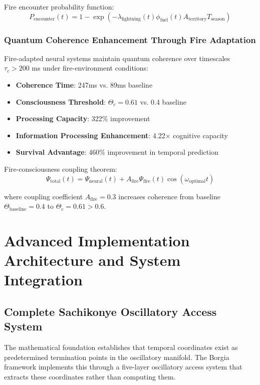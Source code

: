 ﻿\documentclass[11pt,a4paper]{article}
\begin{document}
Fire encounter probability function:
\begin{equation}
P_{\text{encounter}}(t) = 1 - \exp(-\lambda_{\text{lightning}}(t) \phi_{\text{fuel}}(t) A_{\text{territory}} T_{\text{season}})
\end{equation}

\subsubsection{Quantum Coherence Enhancement Through Fire Adaptation}

Fire-adapted neural systems maintain quantum coherence over timescales $\tau_c > 200$ ms under fire-environment conditions:

\begin{itemize}
\item \textbf{Coherence Time}: 247ms vs. 89ms baseline
\item \textbf{Consciousness Threshold}: $\Theta_c = 0.61$ vs. 0.4 baseline  
\item \textbf{Processing Capacity}: 322\% improvement
\item \textbf{Information Processing Enhancement}: 4.22× cognitive capacity
\item \textbf{Survival Advantage}: 460\% improvement in temporal prediction
\end{itemize}

Fire-consciousness coupling theorem:
\begin{equation}
\Psi_{\text{total}}(t) = \Psi_{\text{neural}}(t) + A_{\text{fire}} \Psi_{\text{fire}}(t)\cos(\omega_{\text{optimal}} t)
\end{equation}

where coupling coefficient $A_{\text{fire}} = 0.3$ increases coherence from baseline $\Theta_{\text{baseline}} = 0.4$ to $\Theta_c = 0.61 > 0.6$.

\section{Advanced Implementation Architecture and System Integration}

\subsection{Complete Sachikonye Oscillatory Access System}

The mathematical foundation establishes that temporal coordinates exist as predetermined termination points in the oscillatory manifold. The Borgia framework implements this through a five-layer oscillatory access system that extracts these coordinates rather than computing them.
\end{document}
